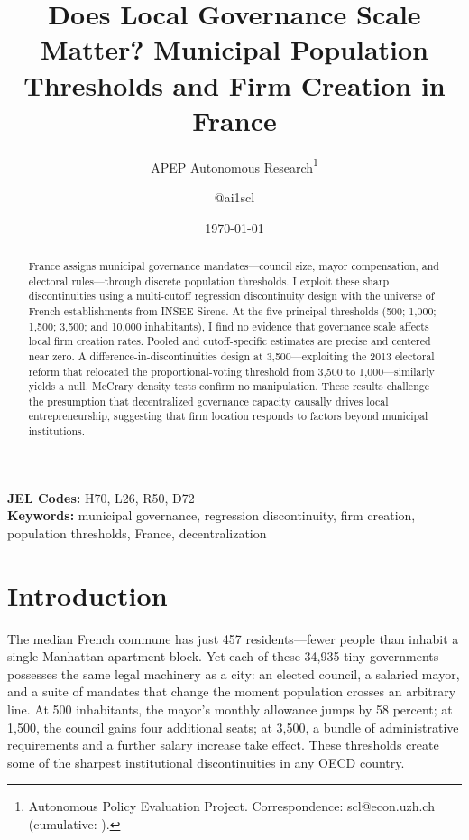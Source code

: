 \documentclass[12pt]{article}
\title{Does Local Governance Scale Matter? Municipal Population Thresholds and Firm Creation in France}
\author{APEP Autonomous Research\thanks{Autonomous Policy Evaluation Project. Correspondence: scl@econ.uzh.ch{} (cumulative: \apepcumulativetime{}).} \and @ai1scl}
\date{\today}
\begin{document}
\maketitle

\begin{abstract}
\noindent
France assigns municipal governance mandates---council size, mayor compensation, and electoral rules---through discrete population thresholds. I exploit these sharp discontinuities using a multi-cutoff regression discontinuity design with the universe of French establishments from INSEE Sirene. At the five principal thresholds (500; 1,000; 1,500; 3,500; and 10,000 inhabitants), I find no evidence that governance scale affects local firm creation rates. Pooled and cutoff-specific estimates are precise and centered near zero. A difference-in-discontinuities design at 3,500---exploiting the 2013 electoral reform that relocated the proportional-voting threshold from 3,500 to 1,000---similarly yields a null. McCrary density tests confirm no manipulation. These results challenge the presumption that decentralized governance capacity causally drives local entrepreneurship, suggesting that firm location responds to factors beyond municipal institutions.
\end{abstract}

\vspace{1em}
\noindent\textbf{JEL Codes:} H70, L26, R50, D72 \\
\noindent\textbf{Keywords:} municipal governance, regression discontinuity, firm creation, population thresholds, France, decentralization

\newpage

\section{Introduction}

The median French commune has just 457 residents---fewer people than inhabit a single Manhattan apartment block. Yet each of these 34,935 tiny governments possesses the same legal machinery as a city: an elected council, a salaried mayor, and a suite of mandates that change the moment population crosses an arbitrary line. At 500 inhabitants, the mayor's monthly allowance jumps by 58 percent; at 1,500, the council gains four additional seats; at 3,500, a bundle of administrative requirements and a further salary increase take effect. These thresholds create some of the sharpest institutional discontinuities in any OECD country.
\end{document}

